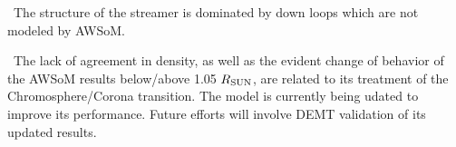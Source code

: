 \documentclass[paperwidth=100cm,paperheight=120cm]{baposter}
\def\bu{\textcolor{red}{\textbullet~}}
\def\bu{\textcolor{red}{\textbullet~}}
\begin{document}
\begin{poster}
{{\bu The structure of the streamer is dominated by down loops which are not modeled by AWSoM.

\bu The lack of agreement in density, as well as the evident change of behavior of the AWSoM results below/above 1.05 $R_{\rm SUN}$, are related to its treatment of the Chromosphere/Corona transition. The model is currently being udated to improve its performance. Future efforts will involve DEMT validation of its updated results.

}
}

\end{poster}%
\end{document}
